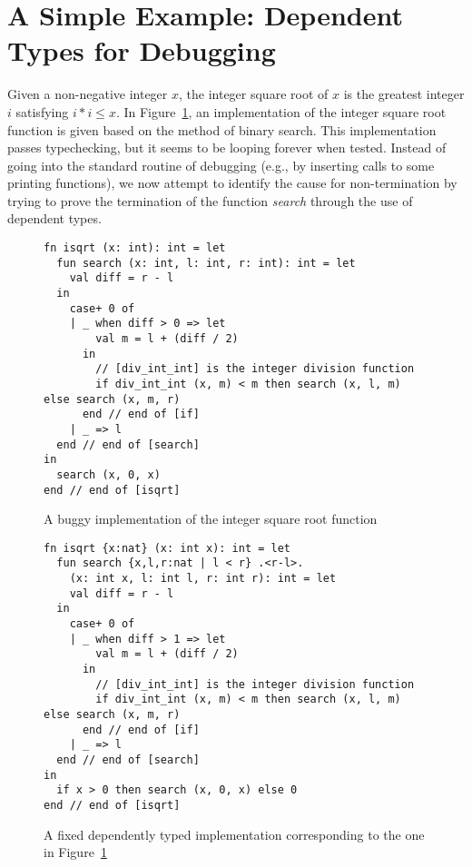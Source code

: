 \section{A Simple Example: Dependent Types for Debugging}
Given a non-negative integer $x$, the integer square root of $x$ is the
greatest integer $i$ satisfying $i * i \leq x$.  In
Figure~\ref{figure:isqrt_function_nondependent}, an implementation of the
integer square root function is given based on the method of binary search.
This implementation passes typechecking, but it seems to be looping forever
when tested. Instead of going into the standard routine of debugging (e.g.,
by inserting calls to some printing functions), we now attempt to identify
the cause for non-termination by trying to prove the termination of the
function {\it search} through the use of dependent types.
\begin{figure}[thp]
\begin{verbatim}
fn isqrt (x: int): int = let
  fun search (x: int, l: int, r: int): int = let
    val diff = r - l
  in
    case+ 0 of
    | _ when diff > 0 => let
        val m = l + (diff / 2)
      in
        // [div_int_int] is the integer division function
        if div_int_int (x, m) < m then search (x, l, m) else search (x, m, r)
      end // end of [if]
    | _ => l
  end // end of [search]
in
  search (x, 0, x)
end // end of [isqrt]
\end{verbatim}
\caption{A buggy implementation of the integer square root function}
\label{figure:isqrt_function_nondependent}
\end{figure}
\begin{figure}[thp]
\begin{verbatim}
fn isqrt {x:nat} (x: int x): int = let
  fun search {x,l,r:nat | l < r} .<r-l>.
    (x: int x, l: int l, r: int r): int = let
    val diff = r - l
  in
    case+ 0 of
    | _ when diff > 1 => let
        val m = l + (diff / 2)
      in
        // [div_int_int] is the integer division function
        if div_int_int (x, m) < m then search (x, l, m) else search (x, m, r)
      end // end of [if]
    | _ => l
  end // end of [search]
in
  if x > 0 then search (x, 0, x) else 0
end // end of [isqrt]
\end{verbatim}
\caption{%
A fixed dependently typed implementation corresponding to the one
in Figure~\ref{figure:isqrt_function_nondependent}
}
\label{figure:isqrt_function_dependent}
\end{figure}

